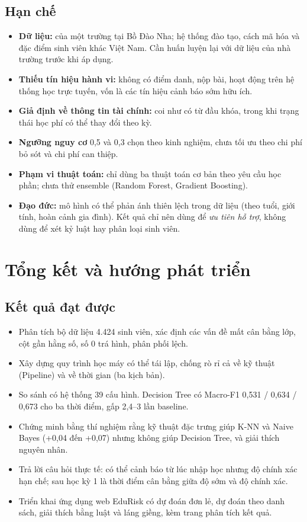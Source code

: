 \documentclass[12pt,a4paper,oneside]{report}
\newcommand{\fone}{Macro-F1}
\begin{document}
\section{Hạn chế}
\begin{itemize}
  \item \textbf{Dữ liệu:} của một trường tại Bồ Đào Nha; hệ thống đào tạo, cách mã hóa và đặc điểm sinh viên khác Việt Nam. Cần huấn luyện lại với dữ liệu của nhà trường trước khi áp dụng.
  \item \textbf{Thiếu tín hiệu hành vi:} không có điểm danh, nộp bài, hoạt động trên hệ thống học trực tuyến, vốn là các tín hiệu cảnh báo sớm hữu ích.
  \item \textbf{Giả định về thông tin tài chính:} coi như có từ đầu khóa, trong khi trạng thái học phí có thể thay đổi theo kỳ.
  \item \textbf{Ngưỡng nguy cơ} 0,5 và 0,3 chọn theo kinh nghiệm, chưa tối ưu theo chi phí bỏ sót và chi phí can thiệp.
  \item \textbf{Phạm vi thuật toán:} chỉ dùng ba thuật toán cơ bản theo yêu cầu học phần; chưa thử ensemble (Random Forest, Gradient Boosting).
  \item \textbf{Đạo đức:} mô hình có thể phản ánh thiên lệch trong dữ liệu (theo tuổi, giới tính, hoàn cảnh gia đình). Kết quả chỉ nên dùng để
        \emph{ưu tiên hỗ trợ}, không dùng để xét kỷ luật hay phân loại sinh viên.
\end{itemize}

\chapter{Tổng kết và hướng phát triển}
\section{Kết quả đạt được}
\begin{itemize}
  \item Phân tích bộ dữ liệu 4.424 sinh viên, xác định các vấn đề mất cân bằng lớp, cột gần hằng số, số 0 trá hình, phân phối lệch.
  \item Xây dựng quy trình học máy có thể tái lập, chống rò rỉ cả về kỹ thuật (Pipeline) và về thời gian (ba kịch bản).
  \item So sánh có hệ thống 39 cấu hình. Decision Tree có \fone{} 0,531 / 0,634 / 0,673 cho ba thời điểm, gấp 2,4--3 lần baseline.
  \item Chứng minh bằng thí nghiệm rằng kỹ thuật đặc trưng giúp K-NN và Naive Bayes (+0,04 đến +0,07) nhưng không giúp Decision Tree, và giải thích nguyên nhân.
  \item Trả lời câu hỏi thực tế: có thể cảnh báo từ lúc nhập học nhưng độ chính xác hạn chế; sau học kỳ 1 là thời điểm cân bằng giữa độ sớm và độ chính xác.
  \item Triển khai ứng dụng web EduRisk có dự đoán đơn lẻ, dự đoán theo danh sách, giải thích bằng luật và láng giềng, kèm trang phân tích kết quả.
\end{itemize}
\end{document}
